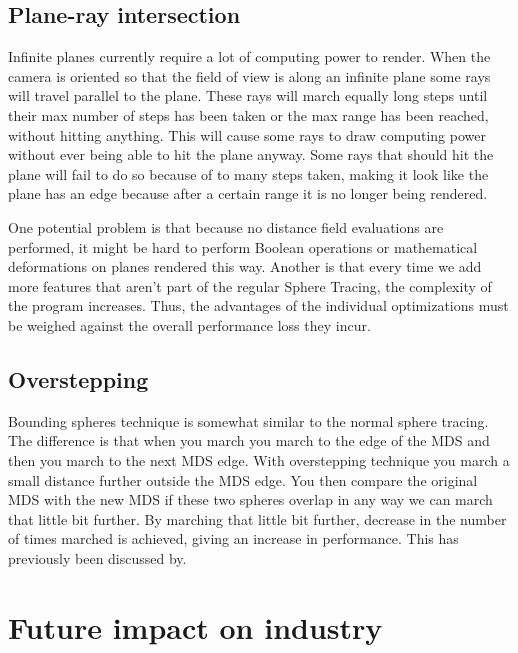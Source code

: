 		\subsection{Plane-ray intersection}

			Infinite planes currently require a lot of computing power to
			render. When the camera is oriented so that the field of view is
			along an infinite plane some rays will travel parallel to the
			plane. These rays will march equally long steps until their max
			number of steps has been taken or the max range has been reached, 
			without hitting anything. This will cause some rays to draw 
			computing power without ever being able to hit the plane anyway. 
			Some rays that should hit the plane will fail to do so because of 
			to many steps taken, making it look like the plane has an edge 
			because after a certain range it is no longer being rendered.

			One potential problem is that because no distance field evaluations 
			are performed, it might be hard to perform Boolean operations or 
			mathematical deformations on planes rendered this way. Another is 
			that every time we add more features that aren't part of the 
			regular Sphere Tracing, the complexity of the program increases. 
			Thus, the advantages of the individual optimizations must be 
			weighed against the overall performance loss they incur. 

		\subsection{Overstepping}

			Bounding spheres technique is somewhat similar to the normal sphere
			tracing. The difference is that when you march you march to the edge of
			the MDS and then you march to the next MDS edge. With overstepping
			technique you march a small distance further outside the MDS edge. You
			then compare the original MDS with the new MDS if these two spheres
			overlap in any way we can march that little bit further. By marching that
			little bit further, decrease in the number of times marched is achieved,
			giving an increase in performance. This has previously been discussed
			by\cite{Korndorfer2014}. 

		
			
			

	\section{Future impact on industry} 

